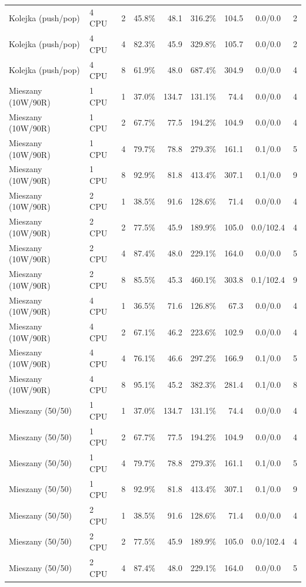 \begin{table}[ht]
{\begin{tabular}{llcrrrrcc}
Kolejka (push/pop) & 4 CPU & 2 & 45.8\% & 48.1 & 316.2\% & 104.5 & 0.0/0.0 & 2 \\
Kolejka (push/pop) & 4 CPU & 4 & 82.3\% & 45.9 & 329.8\% & 105.7 & 0.0/0.0 & 2 \\
Kolejka (push/pop) & 4 CPU & 8 & 61.9\% & 48.0 & 687.4\% & 304.9 & 0.0/0.0 & 4 \\
Mieszany (10W/90R) & 1 CPU & 1 & 37.0\% & 134.7 & 131.1\% & 74.4 & 0.0/0.0 & 4 \\
Mieszany (10W/90R) & 1 CPU & 2 & 67.7\% & 77.5 & 194.2\% & 104.9 & 0.0/0.0 & 4 \\
Mieszany (10W/90R) & 1 CPU & 4 & 79.7\% & 78.8 & 279.3\% & 161.1 & 0.1/0.0 & 5 \\
Mieszany (10W/90R) & 1 CPU & 8 & 92.9\% & 81.8 & 413.4\% & 307.1 & 0.1/0.0 & 9 \\
Mieszany (10W/90R) & 2 CPU & 1 & 38.5\% & 91.6 & 128.6\% & 71.4 & 0.0/0.0 & 4 \\
Mieszany (10W/90R) & 2 CPU & 2 & 77.5\% & 45.9 & 189.9\% & 105.0 & 0.0/102.4 & 4 \\
Mieszany (10W/90R) & 2 CPU & 4 & 87.4\% & 48.0 & 229.1\% & 164.0 & 0.0/0.0 & 5 \\
Mieszany (10W/90R) & 2 CPU & 8 & 85.5\% & 45.3 & 460.1\% & 303.8 & 0.1/102.4 & 9 \\
Mieszany (10W/90R) & 4 CPU & 1 & 36.5\% & 71.6 & 126.8\% & 67.3 & 0.0/0.0 & 4 \\
Mieszany (10W/90R) & 4 CPU & 2 & 67.1\% & 46.2 & 223.6\% & 102.9 & 0.0/0.0 & 4 \\
Mieszany (10W/90R) & 4 CPU & 4 & 76.1\% & 46.6 & 297.2\% & 166.9 & 0.1/0.0 & 5 \\
Mieszany (10W/90R) & 4 CPU & 8 & 95.1\% & 45.2 & 382.3\% & 281.4 & 0.1/0.0 & 8 \\
Mieszany (50/50) & 1 CPU & 1 & 37.0\% & 134.7 & 131.1\% & 74.4 & 0.0/0.0 & 4 \\
Mieszany (50/50) & 1 CPU & 2 & 67.7\% & 77.5 & 194.2\% & 104.9 & 0.0/0.0 & 4 \\
Mieszany (50/50) & 1 CPU & 4 & 79.7\% & 78.8 & 279.3\% & 161.1 & 0.1/0.0 & 5 \\
Mieszany (50/50) & 1 CPU & 8 & 92.9\% & 81.8 & 413.4\% & 307.1 & 0.1/0.0 & 9 \\
Mieszany (50/50) & 2 CPU & 1 & 38.5\% & 91.6 & 128.6\% & 71.4 & 0.0/0.0 & 4 \\
Mieszany (50/50) & 2 CPU & 2 & 77.5\% & 45.9 & 189.9\% & 105.0 & 0.0/102.4 & 4 \\
Mieszany (50/50) & 2 CPU & 4 & 87.4\% & 48.0 & 229.1\% & 164.0 & 0.0/0.0 & 5 \\

\end{tabular}}
\end{table}
